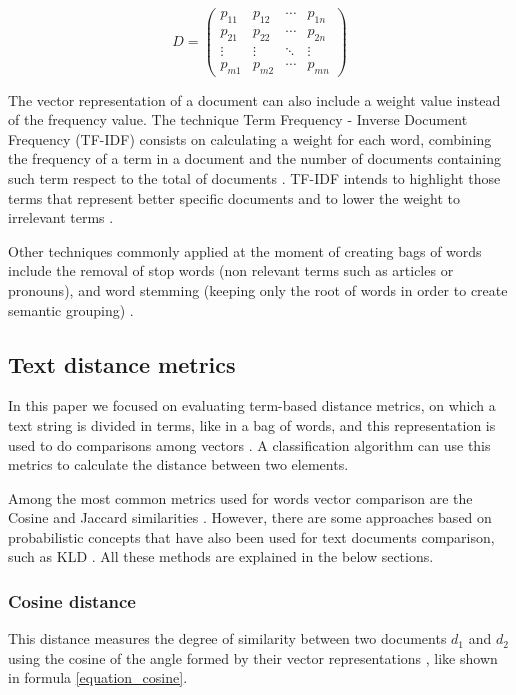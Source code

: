 \documentclass[preprint,12pt,3p]{elsarticle}
\begin{document}
\begin{equation}
\label{equation_D}
D=\begin{pmatrix}
p_{11} & p_{12} & \cdots & p_{1n}\\ 
p_{21} & p_{22} & \cdots & p_{2n}\\ 
\vdots  & \vdots & \ddots  & \vdots \\ 
p_{m1} & p_{m2} & \cdots  & p_{mn}
\end{pmatrix}
\end{equation}

The vector representation of a document can also include a weight value instead of the frequency value. The technique Term Frequency - Inverse Document Frequency (TF-IDF) consists on calculating a weight for each word, combining the frequency of a term in a document and the number of documents containing such term respect to the total of documents \cite{srivastava2009text}. TF-IDF intends to highlight those terms that represent better specific documents and to lower the weight to irrelevant terms \cite{srivastava2009text}.\par

Other techniques commonly applied at the moment of creating bags of words include the removal of stop words (non relevant terms such as articles or pronouns), and word stemming (keeping only the root of words in order to create semantic grouping) \cite{srivastava2009text}.


\subsection{Text distance metrics}

In this paper we focused on evaluating term-based distance metrics, on which a text string is divided in terms, like in a bag of words, and this representation is used to do comparisons among vectors \cite{wang2016non}. A classification algorithm can use this metrics to calculate the distance between two elements.\par

Among the most common metrics used for words vector comparison are the Cosine and Jaccard similarities \cite{soto2015similarity,wang2016non}. However, there are some approaches based on probabilistic concepts that have also been used for text documents comparison, such as KLD \cite{bae2014computing,metzler2007similarity}. All these methods are explained in the below sections.

\subsubsection{Cosine distance}
This distance measures the degree of similarity between two documents ${d_{1}}$ and ${d_{2}}$ using the cosine of the angle formed by their vector representations \cite{soto2015similarity}, like shown in formula \ref{equation_cosine}.
\end{document}

